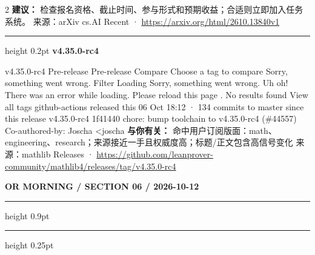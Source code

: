 \documentclass[10.5pt]{ctexart}
\begin{document}
\begin{multicols}{2}
\textbf{建议：} 检查报名资格、截止时间、参与形式和预期收益；合适则立即加入任务系统。
{\footnotesize\color{ormuted} 来源：arXiv cs.AI Recent · \url{https://arxiv.org/html/2610.13840v1}}
\vspace{2mm}
\hrule height 0.2pt
\vspace{2mm}
{\large\bfseries v4.35.0-rc4}\par
v4.35.0-rc4 Pre-release Pre-release Compare Choose a tag to compare Sorry, something went wrong. Filter Loading Sorry, something went wrong. Uh oh! There was an error while loading. Please reload this page . No results found View all tags github-actions released this 06 Oct 18:12 · 134 commits to master since this release v4.35.0-rc4 1f41440 chore: bump toolchain to v4.35.0-rc4 (\#44557) Co-authored-by: Joscha <joscha
\textbf{与你有关：} 命中用户订阅版面：math、engineering、research；来源接近一手且权威度高；标题/正文包含高信号变化
{\footnotesize\color{ormuted} 来源：mathlib Releases · \url{https://github.com/leanprover-community/mathlib4/releases/tag/v4.35.0-rc4}}
\end{multicols}
\newpage
{\small\bfseries OR MORNING / SECTION 06 / 2026-10-12}
\vspace{2mm}
\hrule height 0.9pt
\vspace{1.5mm}
\hrule height 0.25pt
\vspace{4mm}
\end{document}
